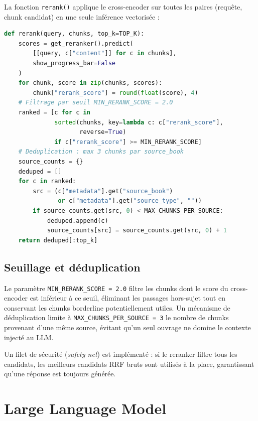 La fonction \texttt{rerank()} applique le cross-encoder sur toutes les paires (requête, chunk candidat) en une seule inférence vectorisée :

\begin{lstlisting}[language=Python, caption={Fonction de reranking par cross-encoder}]
def rerank(query, chunks, top_k=TOP_K):
    scores = get_reranker().predict(
        [[query, c["content"]] for c in chunks],
        show_progress_bar=False
    )
    for chunk, score in zip(chunks, scores):
        chunk["rerank_score"] = round(float(score), 4)
    # Filtrage par seuil MIN_RERANK_SCORE = 2.0
    ranked = [c for c in
              sorted(chunks, key=lambda c: c["rerank_score"],
                     reverse=True)
              if c["rerank_score"] >= MIN_RERANK_SCORE]
    # Deduplication : max 3 chunks par source_book
    source_counts = {}
    deduped = []
    for c in ranked:
        src = (c["metadata"].get("source_book")
               or c["metadata"].get("source_type", ""))
        if source_counts.get(src, 0) < MAX_CHUNKS_PER_SOURCE:
            deduped.append(c)
            source_counts[src] = source_counts.get(src, 0) + 1
    return deduped[:top_k]
\end{lstlisting}

\subsection{Seuillage et déduplication}

Le paramètre \texttt{MIN\_RERANK\_SCORE = 2.0} filtre les chunks dont le score du cross-encoder est inférieur à ce seuil, éliminant les passages hors-sujet tout en conservant les chunks borderline potentiellement utiles. Un mécanisme de déduplication limite à \texttt{MAX\_CHUNKS\_PER\_SOURCE = 3} le nombre de chunks provenant d'une même source, évitant qu'un seul ouvrage ne domine le contexte injecté au LLM.

Un filet de sécurité (\textit{safety net}) est implémenté : si le reranker filtre tous les candidats, les meilleurs candidats RRF bruts sont utilisés à la place, garantissant qu'une réponse est toujours générée.

\section{Large Language Model}

